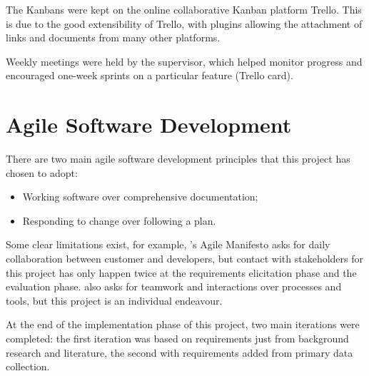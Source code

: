 The Kanbans were kept on the online collaborative Kanban platform Trello. This is due to 
the good extensibility of Trello, with plugins allowing the attachment of links and documents 
from many other platforms.

Weekly meetings were held by the supervisor, which helped monitor progress and encouraged 
one-week sprints on a particular feature (Trello card).

\section{Agile Software Development}

There are two main agile software development principles that this project has chosen to adopt:

\begin{itemize}
    \setlength\itemsep{0em}        
    \item Working software over comprehensive documentation;
    \item Responding to change over following a plan.   
\end{itemize}

Some clear limitations exist, for example, \citet{beck2001agile}'s Agile Manifesto asks for 
daily collaboration between customer and developers, but contact with stakeholders 
for this project has only happen twice at the requirements elicitation 
phase and the evaluation phase. \citet{beck2001agile} also asks for teamwork and 
interactions over processes and tools, but this project is an individual endeavour.

At the end of the implementation phase of this project, two main iterations were completed: 
the first iteration was based on requirements just from background research and literature, 
the second with requirements added from primary data collection.
